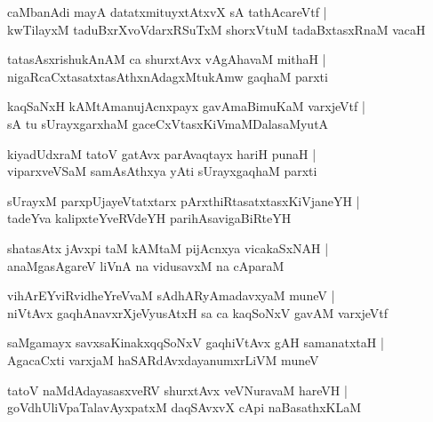 \documentclass[twoside,12pt,openright]{book}
\newcounter{shloka}[chapter]
\begin{document}
\begin{shloka}%
caMbanAdi mayA datatxmituyxtAtxvX sA tathAcareVtf |\\
kwTilayxM taduBxrXvoVdarxRSuTxM shorxVtuM tadaBxtasxRnaM vacaH 
\end{shloka}

\begin{shloka}%
tatasAsxrishukAnAM ca shurxtAvx vAgAhavaM mithaH |\\
nigaRcaCxtasatxtasAthxnAdagxMtukAmw gaqhaM parxti
\end{shloka}

\begin{shloka}%
kaqSaNxH kAMtAmanujAcnxpayx gavAmaBimuKaM varxjeVtf |\\
sA tu sUrayxgarxhaM gaceCxVtasxKiVmaMDalasaMyutA 
\end{shloka}

\begin{shloka}%
kiyadUdxraM tatoV gatAvx parAvaqtayx hariH punaH |\\
viparxveVSaM samAsAthxya yAti sUrayxgaqhaM parxti 
\end{shloka}

\begin{shloka}%
sUrayxM parxpUjayeVtatxtarx pArxthiRtasatxtasxKiVjaneYH |\\
tadeYva kalipxteYveRVdeYH parihAsavigaBiRteYH
\end{shloka}

\begin{shloka}%
shatasAtx jAvxpi taM kAMtaM pijAcnxya vicakaSxNAH |\\
anaMgasAgareV liVnA na vidusavxM na cAparaM 
\end{shloka}

\begin{shloka}%
vihArEYviRvidheYreVvaM sAdhARyAmadavxyaM muneV |\\
niVtAvx gaqhAnavxrXjeVyusAtxH sa ca kaqSoNxV gavAM varxjeVtf
\end{shloka}

\begin{shloka}%
saMgamayx savxsaKinakxqqSoNxV gaqhiVtAvx gAH samanatxtaH |\\
AgacaCxti varxjaM haSARdAvxdayanumxrLiVM muneV 
\end{shloka}

\begin{shloka}%
tatoV naMdAdayasasxveRV shurxtAvx veVNuravaM hareVH |\\
goVdhUliVpaTalavAyxpatxM daqSAvxvX cApi naBasathxKLaM 
\end{shloka}
\end{document}
